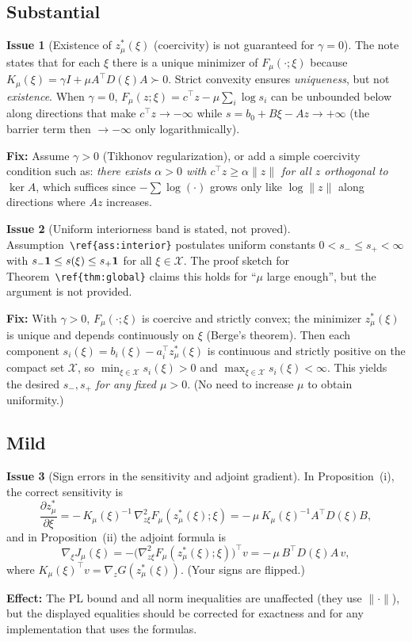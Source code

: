 \documentclass[11pt]{article}
\theoremstyle{definition}
\newtheorem{issue}{Issue}
\begin{document}
\subsection*{Substantial}
\begin{issue}[Existence of $z^*_\mu(\xi)$ (coercivity) is not guaranteed for $\gamma=0$]
The note states that for each $\xi$ there is a unique minimizer of $F_\mu(\cdot;\xi)$ because $K_\mu(\xi)=\gamma I+\mu A^\top D(\xi)A\succ0$. Strict convexity ensures \emph{uniqueness}, but not \emph{existence}. When $\gamma=0$, $F_\mu(z;\xi)=c^\top z-\mu\sum_i\log s_i$ can be unbounded below along directions that make $c^\top z\to-\infty$ while $s=b_0+B\xi-Az\to+\infty$ (the barrier term then $\to -\infty$ only logarithmically). \par
\textbf{Fix:} Assume $\gamma>0$ (Tikhonov regularization), or add a simple coercivity condition such as: \emph{there exists $\alpha>0$ with $c^\top z\ge \alpha\|z\|$ for all $z$ orthogonal to $\ker A$}, which suffices since $-\sum\log(\cdot)$ grows only like $\log\|z\|$ along directions where $Az$ increases.
\end{issue}

\begin{issue}[Uniform interiorness band is stated, not proved]
Assumption~\texttt{\textbackslash ref\{ass:interior\}} postulates uniform constants $0<s_-\le s_+<\infty$ with $s_-{\bf 1}\le s(\xi)\le s_+{\bf 1}$ for all $\xi\in\mathcal X$. The proof sketch for Theorem~\texttt{\textbackslash ref\{thm:global\}} claims this holds for ``$\mu$ large enough'', but the argument is not provided. \par
\textbf{Fix:} With $\gamma>0$, $F_\mu(\cdot;\xi)$ is coercive and strictly convex; the minimizer $z^*_\mu(\xi)$ is unique and depends continuously on $\xi$ (Berge's theorem). Then each component $s_i(\xi)=b_i(\xi)-a_i^\top z^*_\mu(\xi)$ is continuous and strictly positive on the compact set $\mathcal X$, so $\min_{\xi\in\mathcal X}s_i(\xi)>0$ and $\max_{\xi\in\mathcal X}s_i(\xi)<\infty$. This yields the desired $s_-,s_+$ \emph{for any fixed $\mu>0$}. (No need to increase $\mu$ to obtain uniformity.)
\end{issue}

\subsection*{Mild}
\begin{issue}[Sign errors in the sensitivity and adjoint gradient]
In Proposition~(i), the correct sensitivity is
\[
\frac{\partial z^*_\mu}{\partial \xi}
=-\,K_\mu(\xi)^{-1}\,\nabla^2_{z\xi}F_\mu(z^*_\mu(\xi);\xi)
= -\,\mu\,K_\mu(\xi)^{-1}A^\top D(\xi)B,
\]
and in Proposition~(ii) the adjoint formula is
\[
\nabla_\xi J_\mu(\xi)
= -\big(\nabla^2_{z\xi} F_\mu(z^*_\mu(\xi);\xi)\big)^\top v
= -\,\mu\,B^\top D(\xi)A\,v,
\]
where $K_\mu(\xi)^\top v=\nabla_z G(z^*_\mu(\xi))$. (Your signs are flipped.)\par
\textbf{Effect:} The PL bound and all norm inequalities are unaffected (they use $\|\cdot\|$), but the displayed equalities should be corrected for exactness and for any implementation that uses the formulas.
\end{issue}
\end{document}
